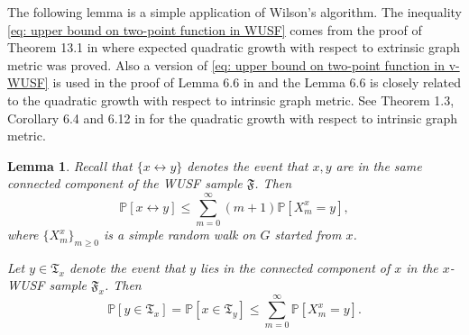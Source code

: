 \documentclass[12pt]{article}
\newtheorem{lemma}[theorem]{Lemma}
\numberwithin{equation}{section}
\newcommand{\be}{\begin{equation}}
\newcommand{\ee}{\end{equation}}
\newcommand{\1}{\mathbf{1}}
\begin{document}
 
 
 
 
The following lemma is a simple application of  Wilson's algorithm. The inequality \eqref{eq: upper bound on two-point function in WUSF}  comes from  the proof of Theorem 13.1 in \cite{BLPS2001} where expected quadratic growth with respect to  extrinsic graph metric was proved. Also a version of \eqref{eq: upper bound on two-point function in v-WUSF} is used in the proof of Lemma 6.6 in \cite{Hutchcroft2018a} and the Lemma 6.6 is closely related to the quadratic growth with respect to intrinsic graph metric. See Theorem 1.3, Corollary 6.4 and 6.12 in  \cite{Hutchcroft2018a} for the quadratic growth with respect to intrinsic graph metric. 
 \begin{lemma}\label{lem: upper bound on two-point functions}
 	Recall that $\{x\leftrightarrow y \}$  denotes the event that  $x,y$ are in the same connected component of the WUSF sample $\mathfrak{F}$. Then
 	\be\label{eq: upper bound on two-point function in WUSF}
 	\mathbb{P}[x\leftrightarrow y]\leq \sum_{m=0}^{\infty}(m+1)\mathbb{P}[X_m^x=y],
 	\ee
 	where $\{X_m^x\}_{m\geq0}$ is a simple random walk on $G$ started from $x$. 
 	
 	Let $y\in\mathfrak{T}_x$ denote the event that $y$ lies in the connected component of $x$ in the $x$-WUSF sample $\mathfrak{F}_x$.
 	Then 
 	\be\label{eq: upper bound on two-point function in v-WUSF}
 	\mathbb{P}[y\in\mathfrak{T}_x]=\mathbb{P}[x\in\mathfrak{T}_y]\leq \sum_{m=0}^{\infty}\mathbb{P}[X_m^x=y].
 	\ee
 	
 \end{lemma}
\end{document}
